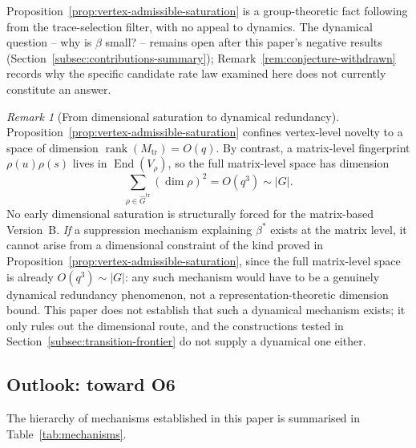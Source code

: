 \documentclass[11pt,a4paper]{article}
\theoremstyle{plain}
\theoremstyle{definition}
\theoremstyle{remark}
\newtheorem{remark}[theorem]{Remark}
\newcommand{\rank}{\operatorname{rank}}
\newcommand{\adm}{\mathrm{tr}}
\newcommand{\Gadm}{\widehat{G}^{\adm}}
\newcommand{\Madm}{M_{\adm}}
\DeclareMathOperator{\End}{End}
\newcommand{\betastar}{\beta^*}
\begin{document}
      Proposition~\ref{prop:vertex-admissible-saturation} is a group-theoretic fact following
      from the trace-selection filter, with no appeal to dynamics.
      The dynamical question -- why is $\beta$ small? -- remains open after this paper's negative
      results (Section~\ref{subsec:contributions-summary}); Remark~\ref{rem:conjecture-withdrawn}
      records why the specific candidate rate law examined here does not currently constitute an
      answer.

      \begin{remark}[From dimensional saturation to dynamical redundancy]
        \label{rem:dim-to-dynred}
        Proposition~\ref{prop:vertex-admissible-saturation} confines vertex-level novelty to a
        space of dimension $\rank(\Madm) = O(q)$.
        By contrast, a matrix-level fingerprint $\rho(u)\rho(s)$ lives in $\End(V_\rho)$, so the
        full matrix-level space has dimension
        \[
          \sum_{\rho \in \Gadm} (\dim \rho)^2 = O(q^3) \sim |G|.
        \]
        No early dimensional saturation is structurally forced for the matrix-based Version~B.
        \emph{If} a suppression mechanism explaining $\betastar$ exists at the matrix level, it
        cannot arise from a dimensional constraint of the kind proved in
        Proposition~\ref{prop:vertex-admissible-saturation}, since the full matrix-level space
        is already $O(q^3) \sim |G|$: any such mechanism would have to be a genuinely dynamical
        redundancy phenomenon, not a representation-theoretic dimension bound.
        This paper does not establish that such a dynamical mechanism exists; it only rules out the
        dimensional route, and the constructions tested in
        Section~\ref{subsec:transition-frontier} do not supply a dynamical one either.
      \end{remark}

    \subsection{Outlook: toward O6}
      \label{subsec:outlook-O6}

      The hierarchy of mechanisms established in this paper is summarised in
      Table~\ref{tab:mechanisms}.
\end{document}
